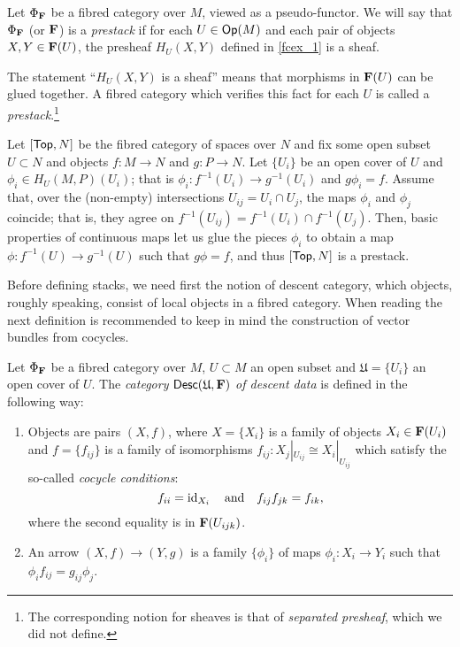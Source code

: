 \begin{defi}
Let $\Phi_{{\bf F}}$ be a fibred category over $M$, viewed as a pseudo-functor. We will say that $\Phi_{{\bf F}}$ (or ${\bf F}$) is a \emph{prestack} if for each $U\in \mathsf{Op}(M)$ and each pair of objects $X,Y\in {\bf F}(U)$, the presheaf $H_U(X,Y)$ defined in \ref{fcex_1} is a sheaf.
\end{defi}

The statement ``$H_U(X,Y)$ is a sheaf'' means that morphisms in ${\bf F}(U)$ can be glued together. A fibred category which verifies this fact for each $U$ is called a \emph{prestack}.\footnote{The corresponding notion for sheaves is that of \emph{separated presheaf}, which we did not define.}

\begin{ej}\label{psex_1}
Let $[\mathsf{Top},N]$ be the fibred category of spaces over $N$ and fix some open subset $U\subset N$ and objects $f:M\to N$ and $g:P\to N$. Let $\{U_i\}$ be an open cover of $U$ and $\phi_i\in H_U(M,P)(U_i)$; that is $\phi_i:f^{-1}(U_i)\to g^{-1}(U_i)$ and $g\phi_i =f$. Assume that, over the (non-empty) intersections $U_{ij}=U_i\cap U_j$, the maps $\phi_i$ and $\phi_j$ coincide; that is, they agree on $f^{-1}(U_{ij})=f^{-1}(U_i)\cap f^{-1}(U_j)$. Then, basic properties of continuous maps let us glue the pieces $\phi_i$ to obtain a map $\phi:f^{-1}(U)\to g^{-1}(U)$ such that $g\phi =f$, and thus $[\mathsf{Top},N]$ is a prestack.
\end{ej}

Before defining stacks, we need first the notion of descent category, which objects, roughly speaking, consist of local objects in a fibred category. When reading the next definition is recommended to keep in mind the construction of vector bundles from cocycles.

\begin{defi}
Let $\Phi_{{\bf F}}$ be a fibred category over $M$, $U\subset M$ an open subset and $\mathfrak{U}=\{U_i\}$ an open cover of $U$. The \emph{category $\mathsf{Desc}(\mathfrak{U},{\bf F})$ of descent data} is defined in the following way:
\begin{enumerate}
\item Objects are pairs $(X,f)$, where $X=\{X_i\}$ is a family of objects $X_i\in {\bf F}(U_i)$ and $f=\{f_{ij}\}$ is a family of isomorphisms $f_{ij}:X_j|_{U_{ij}}\cong X_i|_{U_{ij}}$ which satisfy the so-called \emph{cocycle conditions}:
$$f_{ii}=\operatorname{id}_{X_i} \quad \text{and} \quad f_{ij}f_{jk}=f_{ik},$$
where the second equality is in ${\bf F}(U_{ijk})$.
\item An arrow $(X,f)\to (Y,g)$ is a family $\{\phi_i\}$ of maps $\phi_i:X_i\to Y_i$ such that $\phi_if_{ij}=g_{ij}\phi_j$.
\end{enumerate}
\end{defi}

